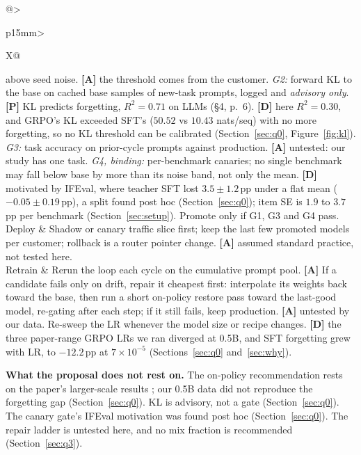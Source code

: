 \documentclass[11pt]{article}
\newcommand{\pp}{\,pp\xspace}
\begin{document}
{\begin{xltabular}{\linewidth}{@{}>{\raggedright\arraybackslash}p{15mm}>{\raggedright\arraybackslash}X@{}}
above seed noise. \textbf{[A]} the threshold comes from the customer. \emph{G2:} forward KL to the base on cached base
samples of new-task prompts, logged and \emph{advisory only}. \textbf{[P]} KL predicts forgetting, $R^2 = 0.71$ on
LLMs (\S4, p.~6). \textbf{[D]} here $R^2 = 0.30$, and GRPO's KL exceeded SFT's ($50.52$ vs $10.43$ nats/seq) with no
more forgetting, so no KL threshold can be calibrated (Section~\ref{sec:q0}, Figure~\ref{fig:kl}). \emph{G3:} task
accuracy on prior-cycle prompts against production. \textbf{[A]} untested: our study has one task. \emph{G4,
binding:} per-benchmark canaries; no single benchmark may fall below base by more than its noise band, not only the
mean. \textbf{[D]} motivated by IFEval, where teacher SFT lost $3.5 \pm 1.2$\pp under a flat mean
($-0.05 \pm 0.19$\pp), a split found post hoc (Section~\ref{sec:q0}); item SE is $1.9$ to $3.7$\pp per benchmark
(Section~\ref{sec:setup}). Promote only if G1, G3 and G4 pass.\\
\addlinespace[2pt]
Deploy & Shadow or canary traffic slice first; keep the last few promoted models per customer; rollback is a
router pointer change. \textbf{[A]} assumed standard practice, not tested here.\\
\addlinespace[2pt]
Retrain & Rerun the loop each cycle on the cumulative prompt pool. \textbf{[A]} If a candidate fails only on
drift, repair it cheapest first: interpolate its weights back toward the base, then run a short on-policy restore
pass toward the last-good model, re-gating after each step; if it still fails, keep production. \textbf{[A]} untested
by our data. Re-sweep the LR whenever the model size or recipe changes. \textbf{[D]} the three paper-range GRPO LRs we ran
diverged at 0.5B, and SFT forgetting grew with LR, to $-12.2$\pp at $7\times10^{-5}$ (Sections~\ref{sec:q0}
and~\ref{sec:why}).\\
\bottomrule
\end{xltabular}}

\textbf{What the proposal does not rest on.} The on-policy recommendation rests on the paper's larger-scale results
\cite[\S3.1, pp.~4--5]{razor}; our 0.5B data did not reproduce the forgetting gap (Section~\ref{sec:q0}). KL is
advisory, not a gate (Section~\ref{sec:q0}). The canary gate's IFEval motivation was found post hoc
(Section~\ref{sec:q0}). The repair ladder is untested here, and no mix fraction is recommended
(Section~\ref{sec:q3}).
\end{document}
